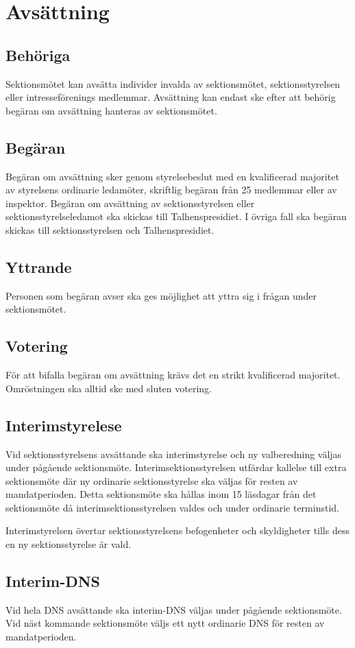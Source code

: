 \section{Avsättning}
\subsection{Behöriga}
Sektionsmötet kan avsätta individer invalda av sektionsmötet, sektionsstyrelsen eller intresseförenings medlemmar.
Avsättning kan endast ske efter att behörig begäran om avsättning hanteras av sektionsmötet.
\subsection{Begäran}
Begäran om avsättning sker genom styrelsebeslut med en kvalificerad majoritet av styrelsens ordinarie ledamöter, skriftlig begäran från 25 medlemmar eller av inspektor.
Begäran om avsättning av sektionsstyrelsen eller sektionsstyrelseledamot ska skickas till Talhenspresidiet.
I övriga fall ska begäran skickas till sektionsstyrelsen och Talhenspresidiet.
\subsection{Yttrande}
Personen som begäran avser ska ges möjlighet att yttra sig i frågan under sektionsmötet.
\subsection{Votering}
För att bifalla begäran om avsättning krävs det en strikt kvalificerad majoritet.
Omröstningen ska alltid ske med sluten votering.
\subsection{Interimstyrelese}
Vid sektionsstyrelsens avsättande ska interimstyrelse och ny valberedning väljas under pågående sektionsmöte.
Interimsektionsstyrelsen utfärdar kallelse till extra sektionsmöte där ny ordinarie sektionsstyrelse ska väljas för resten av mandatperioden.
Detta sektionsmöte ska hållas inom 15 läsdagar från det sektionsmöte då interimsektionsstyrelsen valdes och under ordinarie terminstid.

Interimstyrelsen övertar sektionsstyrelsens befogenheter och skyldigheter tills dess en ny sektionsstyrelse är vald.
\subsection{Interim-DNS}
Vid hela DNS avsättande ska interim-DNS väljas under pågående sektionsmöte.
Vid näst kommande sektionsmöte väljs ett nytt ordinarie DNS för resten av mandatperioden.

